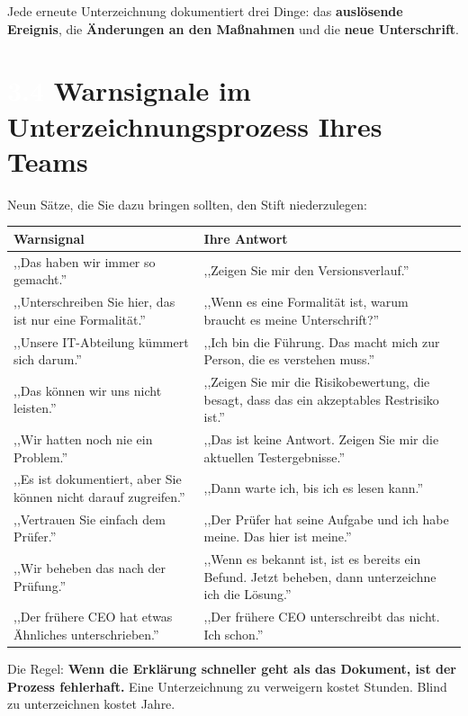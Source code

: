 \documentclass[11pt,a4paper,twoside]{book}
\newcommand{\lessontag}[1]{%
  \texorpdfstring{%
    \setlength{\fboxsep}{3pt}\colorbox{nisd2blue}{\textcolor{white}{\footnotesize\bfseries #1}}\quad%
  }{Lektion #1\ }%
}
\begin{document}
Jede erneute Unterzeichnung dokumentiert drei Dinge: das \textbf{auslösende Ereignis}, die \textbf{Änderungen an den Maßnahmen} und die \textbf{neue Unterschrift}.

\section{\lessontag{3.4}Warnsignale im Unterzeichnungsprozess Ihres Teams}

Neun Sätze, die Sie dazu bringen sollten, den Stift niederzulegen:

\begin{center}
\renewcommand{\arraystretch}{1.3}
\begin{tabularx}{\linewidth}{@{}X X@{}}
\toprule
\textbf{Warnsignal} & \textbf{Ihre Antwort} \\
\midrule
,,Das haben wir immer so gemacht.'' & ,,Zeigen Sie mir den Versionsverlauf.'' \\
,,Unterschreiben Sie hier, das ist nur eine Formalität.'' & ,,Wenn es eine Formalität ist, warum braucht es meine Unterschrift?'' \\
,,Unsere IT-Abteilung kümmert sich darum.'' & ,,Ich bin die Führung. Das macht mich zur Person, die es verstehen muss.'' \\
,,Das können wir uns nicht leisten.'' & ,,Zeigen Sie mir die Risikobewertung, die besagt, dass das ein akzeptables Restrisiko ist.'' \\
,,Wir hatten noch nie ein Problem.'' & ,,Das ist keine Antwort. Zeigen Sie mir die aktuellen Testergebnisse.'' \\
,,Es ist dokumentiert, aber Sie können nicht darauf zugreifen.'' & ,,Dann warte ich, bis ich es lesen kann.'' \\
,,Vertrauen Sie einfach dem Prüfer.'' & ,,Der Prüfer hat seine Aufgabe und ich habe meine. Das hier ist meine.'' \\
,,Wir beheben das nach der Prüfung.'' & ,,Wenn es bekannt ist, ist es bereits ein Befund. Jetzt beheben, dann unterzeichne ich die Lösung.'' \\
,,Der frühere CEO hat etwas Ähnliches unterschrieben.'' & ,,Der frühere CEO unterschreibt das nicht. Ich schon.'' \\
\bottomrule
\end{tabularx}
\end{center}

Die Regel: \textbf{Wenn die Erklärung schneller geht als das Dokument, ist der Prozess fehlerhaft.} Eine Unterzeichnung zu verweigern kostet Stunden. Blind zu unterzeichnen kostet Jahre.
\end{document}
